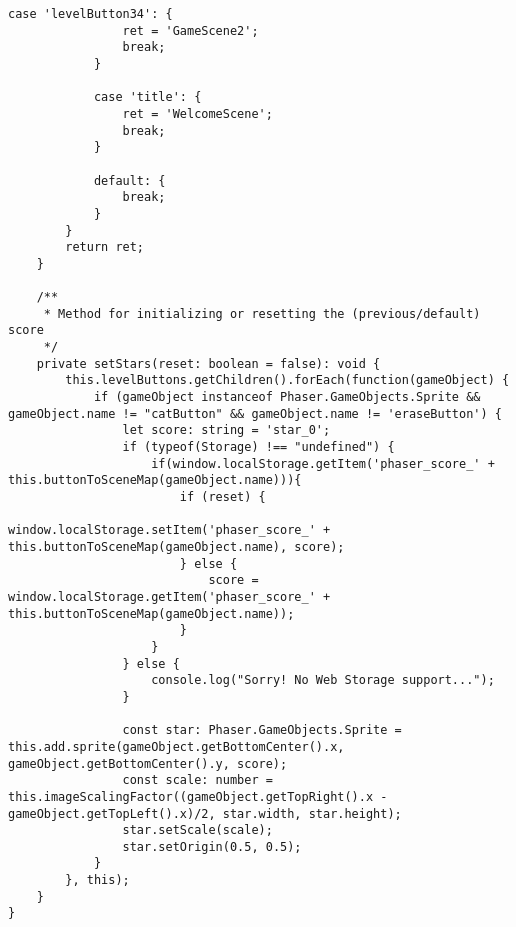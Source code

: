 \begin{lstlisting}[style=TypeScript, caption={levelMenuScene.ts}]
            case 'levelButton34': {
                ret = 'GameScene2';
                break;
            }

            case 'title': {
                ret = 'WelcomeScene';
                break;
            }

            default: {
                break;
            }
        }
        return ret;
    }

    /**
     * Method for initializing or resetting the (previous/default) score
     */
    private setStars(reset: boolean = false): void {
        this.levelButtons.getChildren().forEach(function(gameObject) {
            if (gameObject instanceof Phaser.GameObjects.Sprite && gameObject.name != "catButton" && gameObject.name != 'eraseButton') {
                let score: string = 'star_0';
                if (typeof(Storage) !== "undefined") {
                    if(window.localStorage.getItem('phaser_score_' + this.buttonToSceneMap(gameObject.name))){
                        if (reset) {
                            window.localStorage.setItem('phaser_score_' + this.buttonToSceneMap(gameObject.name), score);
                        } else {
                            score = window.localStorage.getItem('phaser_score_' + this.buttonToSceneMap(gameObject.name));
                        }
                    }
                } else {
                    console.log("Sorry! No Web Storage support...");
                }

                const star: Phaser.GameObjects.Sprite = this.add.sprite(gameObject.getBottomCenter().x, gameObject.getBottomCenter().y, score);
                const scale: number = this.imageScalingFactor((gameObject.getTopRight().x - gameObject.getTopLeft().x)/2, star.width, star.height);
                star.setScale(scale);
                star.setOrigin(0.5, 0.5);
            }
        }, this);
    }
}
\end{lstlisting}

